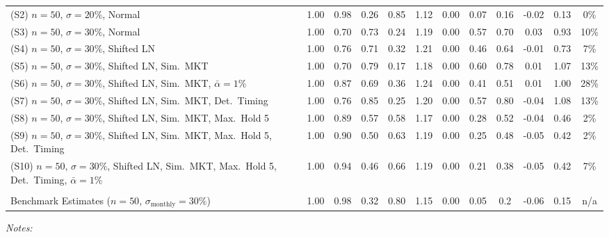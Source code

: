 \begin{table}[htbp]
{\begin{tabular}{l ccccc cccccc}
(S2) $n=50$, $\sigma=20\%$, Normal & 1.00 & 0.98 & 0.26 & 0.85 & 1.12 & 0.00 & 0.07 & 0.16 & -0.02 & 0.13 & 0\% \\
(S3) $n=50$, $\sigma=30\%$, Normal & 1.00 & 0.70 & 0.73 & 0.24 & 1.19 & 0.00 & 0.57 & 0.70 & 0.03 & 0.93 & 10\% \\
(S4) $n=50$, $\sigma=30\%$, Shifted LN & 1.00 & 0.76 & 0.71 & 0.32 & 1.21 & 0.00 & 0.46 & 0.64 & -0.01 & 0.73 & 7\% \\
(S5) $n=50$, $\sigma=30\%$, Shifted LN, Sim.~MKT & 1.00 & 0.70 & 0.79 & 0.17 & 1.18 & 0.00 & 0.60 & 0.78 & 0.01 & 1.07 & 13\% \\
(S6) $n=50$, $\sigma=30\%$, Shifted LN, Sim.~MKT, $\bar{\alpha}=1\%$ & 1.00 & 0.87 & 0.69 & 0.36 & 1.24 & 0.00 & 0.41 & 0.51 & 0.01 & 1.00 & 28\% \\
(S7) $n=50$, $\sigma=30\%$, Shifted LN, Sim.~MKT, Det.~Timing & 1.00 & 0.76 & 0.85 & 0.25 & 1.20 & 0.00 & 0.57 & 0.80 & -0.04 & 1.08 & 13\% \\
(S8) $n=50$, $\sigma=30\%$, Shifted LN, Sim.~MKT, Max.~Hold 5 & 1.00 & 0.89 & 0.57 & 0.58 & 1.17 & 0.00 & 0.28 & 0.52 & -0.04 & 0.46 & 2\% \\
(S9) $n=50$, $\sigma=30\%$, Shifted LN, Sim.~MKT, Max.~Hold 5, Det.~Timing & 1.00 & 0.90 & 0.50 & 0.63 & 1.19 & 0.00 & 0.25 & 0.48 & -0.05 & 0.42 & 2\% \\
(S10) $n=50$, $\sigma=30\%$, Shifted LN, Sim.~MKT, Max.~Hold 5, Det.~Timing, $\bar{\alpha}=1\%$ & 1.00 & 0.94 & 0.46 & 0.66 & 1.19 & 0.00 & 0.21 & 0.38 & -0.05 & 0.42 & 7\% \\
\addlinespace
\multicolumn{12}{l}{\textit{Driessen et al. 2012, Table 1}} \\
Benchmark Estimates ($n=50$, $\sigma_{\text{monthly}}=30\%$) & 1.00 & 0.98 & 0.32 & 0.80 & 1.15 & 0.00 & 0.05 & 0.2 & -0.06 & 0.15 & n/a \\
\bottomrule
\end{tabular}%
}
\begin{minipage}{\linewidth}
\vspace{0.2cm}
\footnotesize \textit{Notes:} 

\end{minipage}
\end{table}
